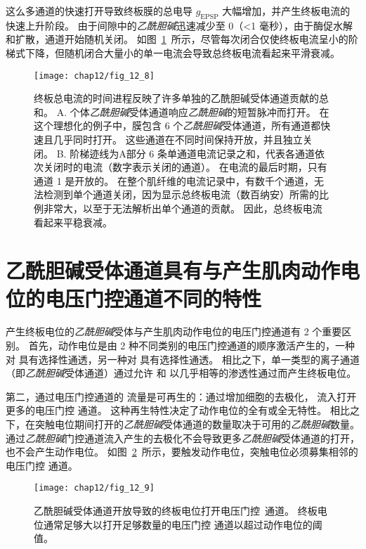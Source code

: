 这么多通道的快速打开导致终板膜的总电导 $ g_{\text{EPSP}} $ 大幅增加，并产生终板电流的快速上升阶段。
由于间隙中的\textit{乙酰胆碱}迅速减少至 0（<1 毫秒），由于酶促水解和扩散，通道开始随机关闭。
如图~\ref{fig:12_8}~所示，尽管每次闭合仅使终板电流呈小的阶梯式下降，但随机闭合大量小的单一电流会导致总终板电流看起来平滑衰减。


\begin{figure}[htbp]
	\centering
	\texttt{[image: chap12/fig\_12\_8]}
	\caption{终板总电流的时间进程反映了许多单独的乙酰胆碱受体通道贡献的总和\cite{colquhoun1981fast}。
		A. 个体\textit{乙酰胆碱}受体通道响应\textit{乙酰胆碱}的短暂脉冲而打开。
		在这个理想化的例子中，膜包含 6 个\textit{乙酰胆碱}受体通道，所有通道都快速且几乎同时打开。
		这些通道在不同时间保持开放，并且独立关闭。
		B. 阶梯迹线为A部分 6 条单通道电流记录之和，代表各通道依次关闭时的电流（数字表示关闭的通道）。
		在电流的最后时期，只有通道 1 是开放的。
		在整个肌纤维的电流记录中，有数千个通道，无法检测到单个通道关闭，因为显示总终板电流（数百纳安）所需的比例非常大，以至于无法解析出单个通道的贡献。
		因此，总终板电流看起来平稳衰减。}
	\label{fig:12_8}
\end{figure}



\section{乙酰胆碱受体通道具有与产生肌肉动作电位的电压门控通道不同的特性}

产生终板电位的\textit{乙酰胆碱}受体与产生肌肉动作电位的电压门控通道有 2 个重要区别。
首先，动作电位是由 2 种不同类别的电压门控通道的顺序激活产生的，一种对  具有选择性通透，另一种对  具有选择性通透。
相比之下，单一类型的离子通道（即\textit{乙酰胆碱}受体通道）通过允许  和  以几乎相等的渗透性通过而产生终板电位。


第二，通过电压门控通道的  流量是可再生的：通过增加细胞的去极化， 流入打开更多的电压门控  通道。
这种再生特性决定了动作电位的全有或全无特性。
相比之下，在突触电位期间打开的\textit{乙酰胆碱}受体通道的数量取决于可用的\textit{乙酰胆碱}数量。
 通过\textit{乙酰胆碱}门控通道流入产生的去极化不会导致更多\textit{乙酰胆碱}受体通道的打开，也不会产生动作电位。
如图~\ref{fig:12_9}~所示，要触发动作电位，突触电位必须募集相邻的电压门控  通道。


\begin{figure}[htbp]
	\centering
	\texttt{[image: chap12/fig\_12\_9]}
	\caption{乙酰胆碱受体通道开放导致的终板电位打开电压门控~通道。
		终板电位通常足够大以打开足够数量的电压门控  通道以超过动作电位的阈值\cite{alberts2017molecular}。}
	\label{fig:12_9}
\end{figure}


